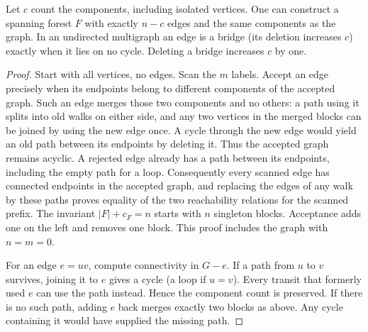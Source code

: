 \begin{theorem}\leavevmode\label{stforest}
Let $c$ count the components, including isolated vertices. One can construct a spanning forest $F$ with exactly $n-c$ edges and the same components as the graph. In an undirected multigraph an edge is a bridge (its deletion increases $c$) exactly when it lies on no cycle. Deleting a bridge increases $c$ by one.
\end{theorem}
\begin{proof}
Start with all vertices, no edges. Scan the $m$ labels. Accept an edge precisely when its endpoints belong to different components of the accepted graph. Such an edge merges those two components and no others: a path using it splits into old walks on either side, and any two vertices in the merged blocks can be joined by using the new edge once. A cycle through the new edge would yield an old path between its endpoints by deleting it. Thus the accepted graph remains acyclic. A rejected edge already has a path between its endpoints, including the empty path for a loop. Consequently every scanned edge has connected endpoints in the accepted graph, and replacing the edges of any walk by these paths proves equality of the two reachability relations for the scanned prefix. The invariant $|F|+c_{F}=n$ starts with $n$ singleton blocks. Acceptance adds one on the left and removes one block. This proof includes the graph with $n=m=0$.

For an edge $e=uv$, compute connectivity in $G-e$. If a path from $u$ to $v$ survives, joining it to $e$ gives a cycle (a loop if $u=v$). Every transit that formerly used $e$ can use the path instead. Hence the component count is preserved. If there is no such path, adding $e$ back merges exactly two blocks as above. Any cycle containing it would have supplied the missing path.
\end{proof}

